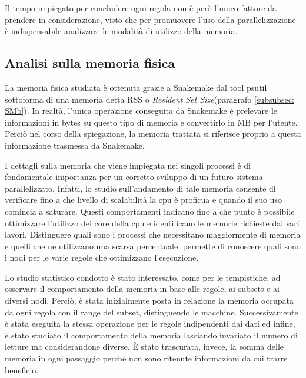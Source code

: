 Il tempo impiegato per concludere ogni regola non è però l'unico fattore da prendere in considerazione, visto che per promuovere l'uso della parallelizzazione è indispensabile analizzare le modalità di utilizzo della memoria. 

\subsection{Analisi sulla memoria fisica}
\label{subsec:Mf}
La memoria fisica studiata è ottenuta grazie a Snakemake dal tool psutil sottoforma di una memoria detta RSS o \textit{Resident Set Size}(paragrafo \ref{subsubsec: SMb}). 
In realtà, l'unica operazione conseguita da Snakemake è prelevare le informazioni in bytes su questo tipo di memoria e convertirlo in MB per l'utente.
Perciò nel corso della spiegazione, la memoria trattata si riferisce proprio a questa informazione trasmessa da Snakemake.  

I dettagli sulla memoria che viene impiegata nei singoli processi è di fondamentale importanza per un corretto sviluppo di un futuro sistema parallelizzato.
Infatti, lo studio sull'andamento di tale memoria consente di verificare fino a che livello di scalabilità la cpu è proficua e quando il suo uso comincia a saturare.
Questi comportamenti indicano fino a che punto è possibile ottimizzare l'utilizzo dei core della cpu e identificano le memorie richieste dai vari lavori.
Distinguere quali sono i processi che necessitano maggiormente di memoria e quelli che ne utilizzano una scarsa percentuale, permette di conoscere quali sono i nodi per le varie regole che ottimizzano l'esecuzione.

Lo studio statistico condotto è stato interessato, come per le tempistiche, ad osservare il comportamento della memoria in base alle regole, ai subsets e ai diversi nodi.
Perciò, è stata inizialmente posta in relazione la memoria occupata da ogni regola con il range del subset, distinguendo le macchine.
Successivamente è stata eseguita la stessa operazione per le regole indipendenti dai dati ed infine, è stato studiato il comportamento della memoria lasciando invariato il numero di letture ma considerandone diverse.
È stato trascurata, invece, la somma delle memoria in ogni passaggio perchè non sono ritenute informazioni da cui trarre beneficio. 
    

